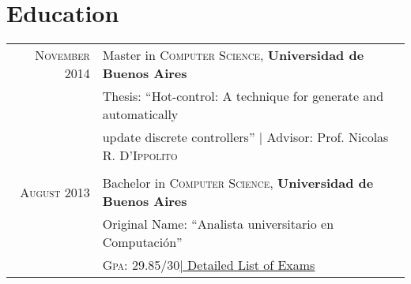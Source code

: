 \section{Education}
\begin{tabular}{rl} 
\textsc{November} 2014 & Master in \textsc{Computer Science}, \textbf{Universidad de Buenos Aires}\\
 & Thesis: ``Hot-control: A technique for generate and automatically \\
 & update discrete controllers'' | \small Advisor:  Prof. Nicolas R. \textsc{D'Ippolito}\\
 &\\

\textsc{August} 2013 & Bachelor in \textsc{Computer Science}, \textbf{Universidad de Buenos Aires} \\
 & Original Name: ``Analista universitario en Computación''\\
 &\normalsize \textsc{Gpa}: 29.85/30\hyperlink{grds_cleli}{\hfill| \footnotesize Detailed List of Exams}\\

\end{tabular}

